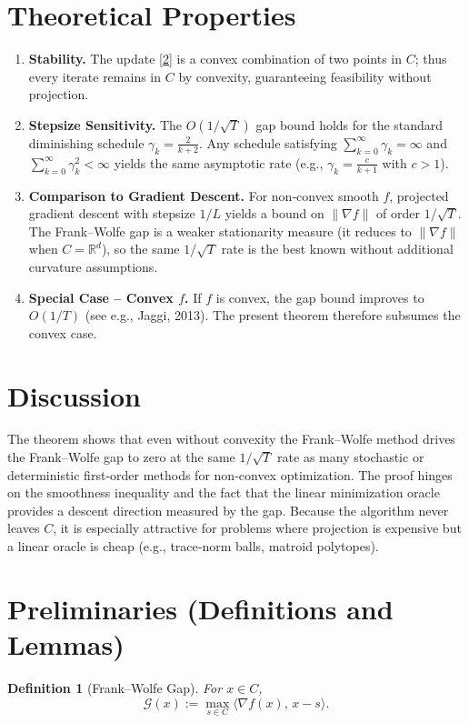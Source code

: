 \documentclass{article}
\newtheorem{definition}{Definition}
\newcommand{\gap}{\mathcal{G}}
\begin{document}
\section*{Theoretical Properties}
\begin{enumerate}[label=\arabic*.]
\item \textbf{Stability.} The update \eqref{2} is a convex combination of two points in $C$; thus every iterate remains in $C$ by convexity, guaranteeing feasibility without projection.
\item \textbf{Stepsize Sensitivity.} The $O(1/\sqrt{T})$ gap bound holds for the standard diminishing schedule $\gamma_k=\frac{2}{k+2}$.  Any schedule satisfying $\sum_{k=0}^{\infty}\gamma_k =\infty$ and $\sum_{k=0}^{\infty}\gamma_k^2<\infty$ yields the same asymptotic rate (e.g., $\gamma_k=\frac{c}{k+1}$ with $c>1$).
\item \textbf{Comparison to Gradient Descent.} For non‑convex smooth $f$, projected gradient descent with stepsize $1/L$ yields a bound on $\|\nabla f\|$ of order $1/\sqrt{T}$.  The Frank–Wolfe gap is a weaker stationarity measure (it reduces to $\|\nabla f\|$ when $C=\mathbb{R}^d$), so the same $1/\sqrt{T}$ rate is the best known without additional curvature assumptions.
\item \textbf{Special Case – Convex $f$.} If $f$ is convex, the gap bound improves to $O(1/T)$ (see e.g., Jaggi, 2013).  The present theorem therefore subsumes the convex case.
\end{enumerate}

\section*{Discussion}
The theorem shows that even without convexity the Frank–Wolfe method drives the Frank–Wolfe gap to zero at the same $1/\sqrt{T}$ rate as many stochastic or deterministic first‑order methods for non‑convex optimization.  The proof hinges on the smoothness inequality and the fact that the linear minimization oracle provides a descent direction measured by the gap.  Because the algorithm never leaves $C$, it is especially attractive for problems where projection is expensive but a linear oracle is cheap (e.g., trace‑norm balls, matroid polytopes).

\newpage
\section*{Preliminaries (Definitions and Lemmas)}
\begin{definition}[Frank–Wolfe Gap]\label{def:gap}
For $x\in C$,
\[
\gap(x) := \max_{s\in C}\langle\nabla f(x),\,x-s\rangle.
\]
\end{definition}
\end{document}
